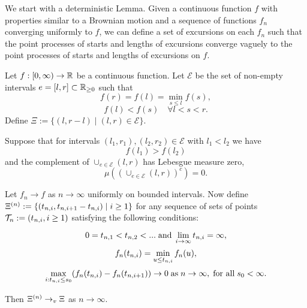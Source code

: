 We start with a deterministic Lemma.
Given a continuous function $f$ with properties similar to a Brownian motion
and a sequence of functions $f_n$ converging uniformly to $f$,
we can define a set of excursions on each $f_n$ such that
the point processes of starts and lengths of excursions converge vaguely to the point processes of starts and lengths of excursions on $f$.

\begin{lemma} \label{L: Deterministic Lemma}
	Let $f:[0, \infty) \rightarrow \mathbb{R}$ be a continuous function. 
	Let $\mathcal{E}$ be the set of non-empty intervals 
	$e=[l,r] \subset \mathbb{R}_{\geq 0}$
	such that
	\begin{equation} \label{E: f cond 1}
	f(r) = f(l) = \min_{s \leq l} f(s),
	\end{equation}
	\begin{equation} \label{E: f cond 2}
	f(l) < f(s) \quad \forall l < s < r.
	\end{equation}
	Define $\Xi := \lbrace (l, r-l) \; | \; (l, r) \in \mathcal{E} \rbrace$.
	
	Suppose that for intervals $(l_1, r_1), (l_2, r_2) \in \mathcal{E}$ with $l_1 < l_2$ we have 
	\begin{equation} \label{E: f cond f(l1) > f(l2)}
	f(l_1) > f(l_2)
	\end{equation}
	and the complement of $\cup_{e \in \mathcal{E}} (l,r)$ has Lebesgue measure zero,
	\begin{equation} \label{E: f cond complement zero}
	\mu \left( \left( \cup_{e \in \mathcal{E}} (l,r) \right)^c\right) = 0.
	\end{equation}
	
	Let $f_n \rightarrow f$ as $n \rightarrow \infty$ uniformly on bounded intervals.
	Now define $\Xi^{(n)} := \lbrace (t_{n, i}, t_{n, i+1} - t_{n, i}) \; | \; i \geq 1 \rbrace$
	for any sequence of sets of points $\mathcal{T}_n := (t_{n, i}, i \geq 1)$ satisfying the following conditions:
	
	\begin{equation} \label{E: fn cond 3}
	0 = t_{n, 1} < t_{n, 2} < ... \; \text{and} \; \lim_{i \rightarrow \infty} t_{n, i} = \infty,
	\end{equation}
	\begin{equation} \label{E: fn cond 4}
	f_n(t_{n, i}) = \min_{u \leq t_{n, i}}f_n(u), 
	\end{equation}
	\begin{equation} \label{E: fn cond 5}
	\max_{i: t_{n, i} \leq s_0}(f_n(t_{n, i}) - f_n(t_{n, i+1})) \rightarrow 0 \; \text{as} \; n \rightarrow \infty, \; \text{for all} \; s_0 < \infty.
	\end{equation}
	
	Then $\Xi^{(n)} \rightarrow_v \Xi$ as $n \rightarrow \infty$.
\end{lemma}

